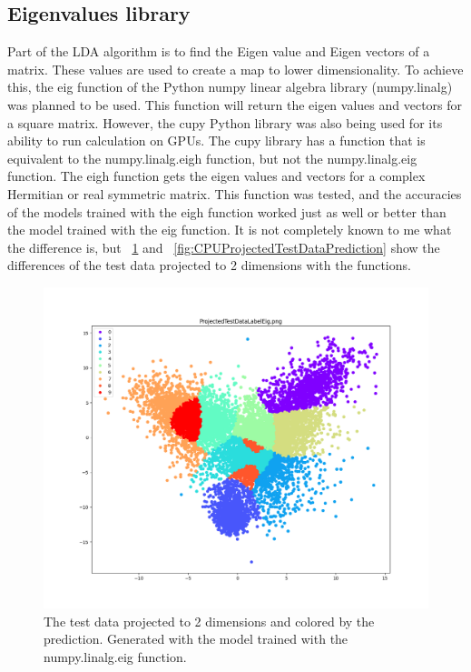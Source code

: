\documentclass[12pt, twocolumn]{article}
\begin{document}
\subsection{ Eigenvalues library}
Part of the LDA algorithm is to find the Eigen value and Eigen vectors of a matrix. These values are used to create a map to lower dimensionality. To achieve this, the eig function of the Python numpy linear algebra library (numpy.linalg) was planned to be used. This function will return the eigen values and vectors for a square matrix. However, the cupy Python library was also being used for its ability to run calculation on GPUs. The cupy library has a function that is equivalent to the numpy.linalg.eigh function, but not the numpy.linalg.eig function. The eigh function gets the eigen values and vectors for a complex Hermitian or real symmetric matrix. This function was tested, and the accuracies of the models trained with the eigh function worked just as well or better than the model trained with the eig function. It is not completely known to me what the difference is, but ~\ref{fig:ProjectedTestDataPrediction} and ~\ref{fig:CPUProjectedTestDataPrediction} show the differences of the test data projected to 2 dimensions with the functions.


\begin{figure}
    \centering
    \includegraphics[width=\textwidth]{images/ProjectedTestDataPredictionEig.png}
    \caption{The test data projected to 2 dimensions and colored by the prediction. Generated with the model trained with the numpy.linalg.eig function.%
      \label{fig:ProjectedTestDataPrediction}}
\end{figure}
\end{document}
